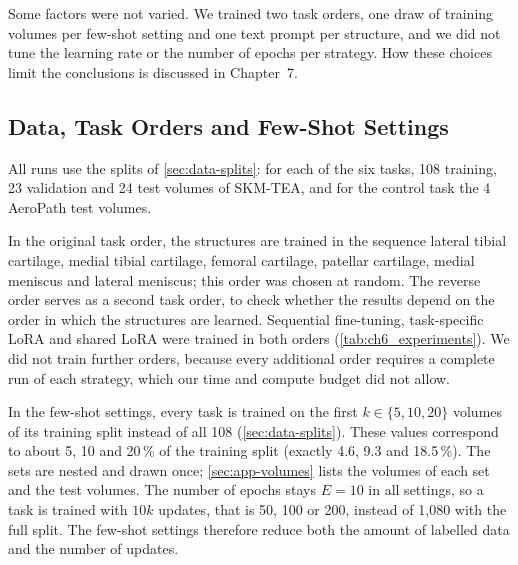 Some factors were not varied.
We trained two task orders, one draw of training volumes per few-shot setting and one text prompt per structure, and we did not tune the learning rate or the number of epochs per strategy.
How these choices limit the conclusions is discussed in Chapter~7.

\begin{table}[tb]
\centering
\caption[Overview of the experiments]{Overview of the experiments. Each configuration was trained once. Training volumes per task: 108 is the full training split. Objective: number of the research objective in \cref{sec:intro-rq}. All runs use the original task order unless stated otherwise.}
\label{tab:ch6_experiments}

\end{table}

\subsection{Data, Task Orders and Few-Shot Settings}
\label{subsec:exp-data}

All runs use the splits of \cref{sec:data-splits}: for each of the six tasks, 108 training, 23 validation and 24 test volumes of SKM-TEA, and for the control task the 4 AeroPath test volumes.

In the original task order, the structures are trained in the sequence lateral tibial cartilage, medial tibial cartilage, femoral cartilage, patellar cartilage, medial meniscus and lateral meniscus; this order was chosen at random.
The reverse order serves as a second task order, to check whether the results depend on the order in which the structures are learned.
Sequential fine-tuning, task-specific LoRA and shared LoRA were trained in both orders (\cref{tab:ch6_experiments}).
We did not train further orders, because every additional order requires a complete run of each strategy, which our time and compute budget did not allow.

In the few-shot settings, every task is trained on the first $k \in \{5, 10, 20\}$ volumes of its training split instead of all 108 (\cref{sec:data-splits}).
These values correspond to about 5, 10 and 20\,\% of the training split (exactly 4.6, 9.3 and 18.5\,\%).
The sets are nested and drawn once; \cref{sec:app-volumes} lists the volumes of each set and the test volumes.
The number of epochs stays $E = 10$ in all settings, so a task is trained with $10k$ updates, that is 50, 100 or 200, instead of 1{,}080 with the full split.
The few-shot settings therefore reduce both the amount of labelled data and the number of updates.

